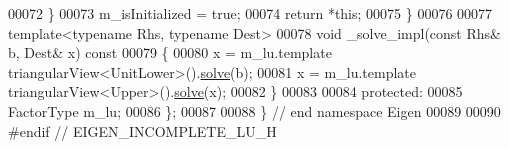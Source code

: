 \begin{DoxyCode}
00072       \}
00073       m\_isInitialized = \textcolor{keyword}{true};
00074       \textcolor{keywordflow}{return} *\textcolor{keyword}{this};
00075     \}
00076 
00077     \textcolor{keyword}{template}<\textcolor{keyword}{typename} Rhs, \textcolor{keyword}{typename} Dest>
00078     \textcolor{keywordtype}{void} \_solve\_impl(\textcolor{keyword}{const} Rhs& b, Dest& x)\textcolor{keyword}{ const}
00079 \textcolor{keyword}{    }\{
00080       x = m\_lu.template triangularView<UnitLower>().\hyperlink{group___sparse_core___module_a4a66e9498b06e3ec4ec36f06b26d4e8f}{solve}(b);
00081       x = m\_lu.template triangularView<Upper>().\hyperlink{group___sparse_core___module_a4a66e9498b06e3ec4ec36f06b26d4e8f}{solve}(x);
00082     \}
00083 
00084   \textcolor{keyword}{protected}:
00085     FactorType m\_lu;
00086 \};
00087 
00088 \} \textcolor{comment}{// end namespace Eigen}
00089 
00090 \textcolor{preprocessor}{#endif // EIGEN\_INCOMPLETE\_LU\_H}
\end{DoxyCode}
